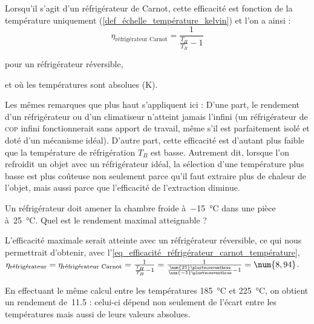 		Lorsqu’il s’agit d’un réfrigérateur de Carnot, cette efficacité est fonction de la température uniquement (\ref{def_échelle_température_kelvin}) et l’on a ainsi :
		\begin{equation}
			\eta_\text{réfrigérateur Carnot} = \frac{1}{\frac{T_H}{T_B} - 1}
			\label{eq_efficacité_réfrigérateur_carnot_température}
		\end{equation}
		\begin{equationterms}
			\item pour un réfrigérateur réversible,
			\item et où les températures sont absolues (\si{\kelvin}).
		\end{equationterms}

		Les mêmes remarques que plus haut s’appliquent ici : D’une part, le rendement d’un réfrigérateur ou d’un climatiseur n’atteint jamais l’infini (un réfrigérateur de \textsc{cop} infini fonctionnerait sans apport de travail, même s’il est parfaitement isolé et doté d’un mécanisme idéal). D’autre part, cette efficacité est d’autant plus faible que la température de réfrigération $T_B$ est basse. Autrement dit, lorsque l’on refroidit un objet avec un réfrigérateur idéal, la sélection d’une température plus basse est plus coûteuse non seulement parce qu’il faut extraire plus de chaleur de l’objet, mais aussi parce que l’efficacité de l’extraction diminue. 
		 
		 \begin{anexample}
		 \label{ex_efficacite_refrigerateur_carnot}
		 	Un réfrigérateur doit amener la chambre froide à~\SI{-15}{\degreeCelsius} dans une pièce à~\SI{25}{\degreeCelsius}. Quel est le rendement maximal atteignable ?
		 		\begin{answer}
		 			L’efficacité maximale serait atteinte avec un réfrigérateur réversible, ce qui nous permettrait d’obtenir, avec l’\cref{eq_efficacité_réfrigérateur_carnot_température}, $\eta_\text{réfrigérateur} = \eta_\text{réfrigérateur Carnot} = \frac{1}{\frac{T_H}{T_B} - 1} = \frac{1}{\frac{\num{25}\plustwoseventhree}{\num{-5}\plustwoseventhree} - 1} = \num{8,94}$.
		 		\end{answer}
		 			\begin{remark}En effectuant le même calcul entre les températures \SI{185}{\degreeCelsius} et \SI{225}{\degreeCelsius}, on obtient un rendement de~\num{11,5} : celui-ci dépend non seulement de l’écart entre les températures mais aussi de leurs valeurs absolues.\end{remark}
		 \end{anexample}


